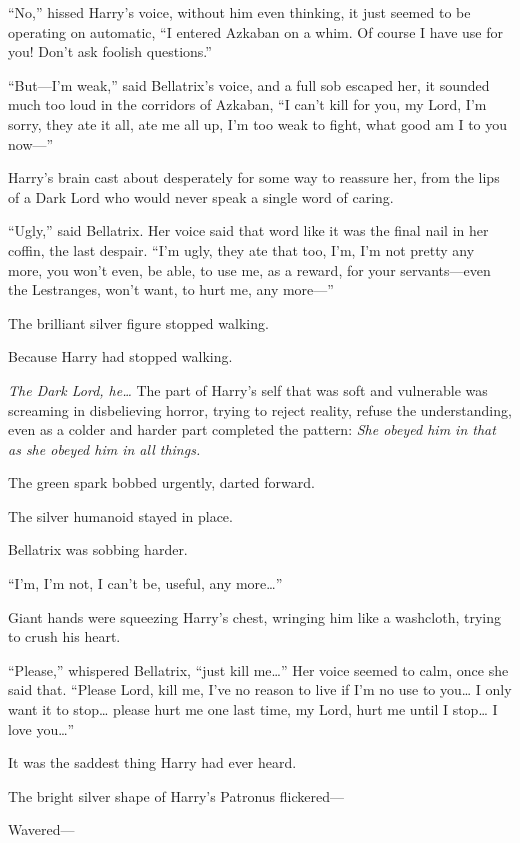 ``No,'' hissed Harry's voice, without him even thinking, it just seemed
to be operating on automatic, ``I entered Azkaban on a whim. Of course I
have use for you! Don't ask foolish questions.''

``But---I'm weak,'' said Bellatrix's voice, and a full sob escaped her,
it sounded much too loud in the corridors of Azkaban, ``I can't kill for
you, my Lord, I'm sorry, they ate it all, ate me all up, I'm too weak to
fight, what good am I to you now---''

Harry's brain cast about desperately for some way to reassure her, from
the lips of a Dark Lord who would never speak a single word of caring.

``Ugly,'' said Bellatrix. Her voice said that word like it was the final
nail in her coffin, the last despair. ``I'm ugly, they ate that too,
I'm, I'm not pretty any more, you won't even, be able, to use me, as a
reward, for your servants---even the Lestranges, won't want, to hurt me,
any more---''

The brilliant silver figure stopped walking.

Because Harry had stopped walking.

\emph{The Dark Lord, he\ldots{}} The part of Harry's self that was soft
and vulnerable was screaming in disbelieving horror, trying to reject
reality, refuse the understanding, even as a colder and harder part
completed the pattern: \emph{She obeyed him in that as she obeyed him in
all things.}

The green spark bobbed urgently, darted forward.

The silver humanoid stayed in place.

Bellatrix was sobbing harder.

``I'm, I'm not, I can't be, useful, any more\ldots{}''

Giant hands were squeezing Harry's chest, wringing him like a washcloth,
trying to crush his heart.

``Please,'' whispered Bellatrix, ``just kill me\ldots{}'' Her voice
seemed to calm, once she said that. ``Please Lord, kill me, I've no
reason to live if I'm no use to you\ldots{} I only want it to
stop\ldots{} please hurt me one last time, my Lord, hurt me until I
stop\ldots{} I love you\ldots{}''

It was the saddest thing Harry had ever heard.

The bright silver shape of Harry's Patronus flickered---

Wavered---

